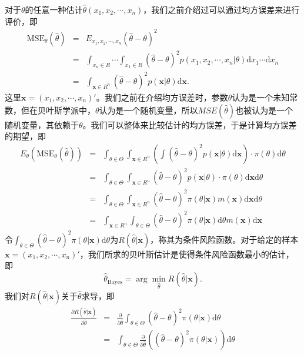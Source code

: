 \begin{remark}
\begin{enumerate}
    对于$\theta$的任意一种估计$\hat{\theta}(x_1,x_2,\cdots,x_n)$，我们之前介绍过可以通过均方误差来进行评价，即
    \begin{eqnarray*}
        \text{MSE}_{\theta}(\hat{\theta}) &=& E_{x_1,x_2,\cdots,x_n}(\hat{\theta}-\theta)^2\\
        &=& \int_{x_n \in R} \cdots \int_{x_1 \in R} (\hat{\theta}-\theta)^2 p(x_1,x_2,\cdots,x_n|\theta) \text{d}x_1\cdots\text{d}x_n\\
        &=& \int_{\bm{x} \in R^{n}} (\hat{\theta}-\theta)^2  p(\bm{x}|\theta) \text{d} \bm{x}.
    \end{eqnarray*}
    这里$\bm{x} = (x_1,x_2,\cdots,x_n)'$。我们之前在介绍均方误差时，参数$\theta$认为是一个未知常数，但在贝叶斯学派中，$\theta$认为是一个随机变量，所以$MSE(\hat{\theta})$也被认为是一个随机变量，其依赖于$\theta$。我们可以整体来比较估计的均方误差，于是计算均方误差的期望，即
    \begin{eqnarray*}
        E_\theta(\text{MSE}_{\theta}(\hat{\theta})) &=& \int_{\theta \in \Theta} \int_{\bm{x} \in R^{n}} \left( \int (\hat{\theta}-\theta)^2  p(\bm{x}|\theta) \text{d} \bm{x} \right)\cdot  \pi(\theta) \text{d} \theta\\
        &=& \int_{\theta \in \Theta} \int_{\bm{x} \in R^{n}}   (\hat{\theta}-\theta)^2  p(\bm{x}|\theta)  \cdot  \pi(\theta) \text{d} \bm{x} \text{d} \theta\\
        &=& \int_{\theta \in \Theta} \int_{\bm{x} \in R^{n}}   (\hat{\theta}-\theta)^2  \pi(\theta|\bm{x}) m(\bm{x})\text{d} \bm{x} \text{d} \theta\\
        &=&\int_{\bm{x} \in R^{n}}   \int_{\theta \in \Theta}  (\hat{\theta}-\theta)^2  \pi(\theta|\bm{x}) \text{d} \theta  m(\bm{x}) \text{d} \bm{x}
    \end{eqnarray*}
    令$\int_{\theta \in \Theta}  (\hat{\theta}-\theta)^2  \pi(\theta|\bm{x}) \text{d} \theta$为$R(\hat{\theta}|\bm{x})$，称其为条件风险函数。对于给定的样本$\bm{x} = (x_1,x_2,\cdots,x_n)'$，我们所求的贝叶斯估计是使得条件风险函数最小的估计，即
    $$
    \hat{\theta}_{\text{Bayes}} = \arg\min_{\hat{\theta}} R(\hat{\theta}|\bm{x}).
    $$
    我们对$R(\hat{\theta}|\bm{x})$关于$\hat{\theta}$求导，即
    \begin{eqnarray*}
        \frac{\partial R(\hat{\theta}|\bm{x})}{\partial \hat{\theta}} &=& \frac{\partial }{\partial \hat{\theta}} \int_{\theta \in \Theta}  (\hat{\theta}-\theta)^2  \pi(\theta|\bm{x}) \text{d} \theta\\
        & = & \int_{\theta \in \Theta}  \frac{\partial }{\partial \hat{\theta}}  \left((\hat{\theta}-\theta)^2  \pi(\theta|\bm{x}) \right)\text{d} \theta \\

\end{eqnarray*}
\end{enumerate}
\end{remark}
